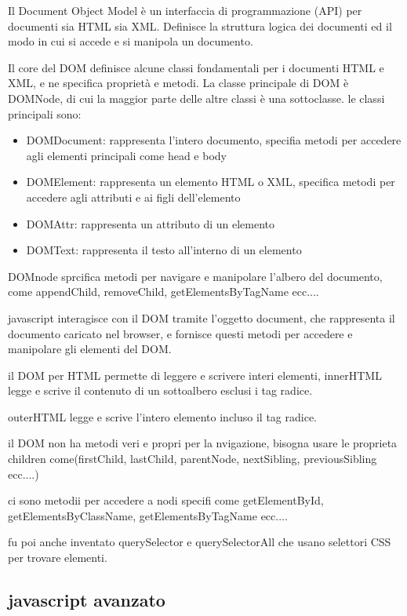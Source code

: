 \documentclass[12pt]{article}
\begin{document}
Il Document Object Model è un interfaccia di
programmazione (API) per documenti sia HTML sia XML.
Definisce la struttura logica dei documenti ed il modo in cui si
accede e si manipola un documento.

Il core del DOM definisce alcune classi fondamentali per i
documenti HTML e XML, e ne specifica proprietà e metodi.
La classe principale di DOM è DOMNode, di cui la maggior
parte delle altre classi è una sottoclasse.
le classi principali sono:
\begin{itemize}
    \item DOMDocument: rappresenta l'intero documento, specifia metodi per accedere agli elementi principali come head e body
    \item DOMElement: rappresenta un elemento HTML o XML, specifica metodi per accedere agli attributi e ai figli dell'elemento
    \item DOMAttr: rappresenta un attributo di un elemento
    \item DOMText: rappresenta il testo all'interno di un elemento
 \end{itemize}

DOMnode sprcifica metodi per navigare e manipolare l'albero del documento, come appendChild, removeChild, getElementsByTagName ecc....

javascript interagisce con il DOM tramite l'oggetto document, che rappresenta il documento caricato nel browser, e fornisce questi metodi per accedere e manipolare gli elementi del DOM.

il DOM per HTML permette di leggere e scrivere interi elementi, innerHTML legge e scrive il contenuto di un sottoalbero esclusi i tag radice.

outerHTML legge e scrive l'intero elemento incluso il tag radice.

il DOM non ha metodi veri e propri per la nvigazione, bisogna usare le proprieta children come(firstChild, lastChild, parentNode, nextSibling, previousSibling ecc....)

ci sono metodii per accedere a nodi specifi come getElementById, getElementsByClassName, getElementsByTagName ecc....

fu poi anche inventato querySelector e querySelectorAll che usano selettori CSS per trovare elementi.

\subsection{javascript avanzato}
\end{document}
